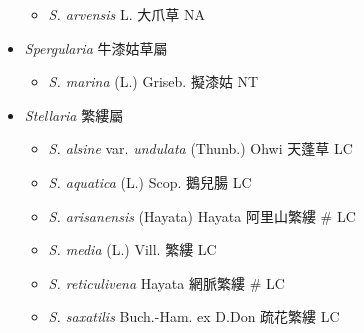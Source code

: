 \begin{itemize}
  \begin{itemize}
        \item[] \textit{S. arvensis} L.  大爪草   NA
  \end{itemize}
 \item[] \textit{Spergularia} 牛漆姑草屬
                                
  \begin{itemize}
        \item[] \textit{S. marina} (L.) Griseb.  擬漆姑   NT
  \end{itemize}
 \item[] \textit{Stellaria} 繁縷屬
                                
  \begin{itemize}
        \item[] \textit{S. alsine} var. \textit{undulata} (Thunb.) Ohwi  天蓬草   LC
        \item[] \textit{S. aquatica} (L.) Scop.  鵝兒腸   LC
        \item[] \textit{S. arisanensis} (Hayata) Hayata  阿里山繁縷  \# LC
        \item[] \textit{S. media} (L.) Vill.  繁縷   LC
        \item[] \textit{S. reticulivena} Hayata  網脈繁縷  \# LC
        \item[] \textit{S. saxatilis} Buch.-Ham. ex D.Don  疏花繁縷   LC
  \end{itemize}
  \end{itemize}
